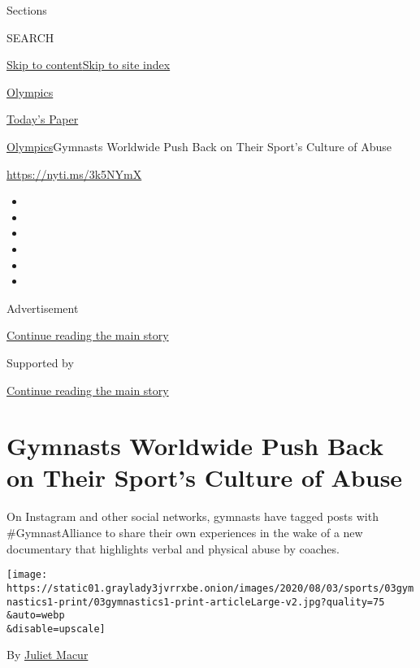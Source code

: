 Sections

SEARCH

\protect\hyperlink{site-content}{Skip to
content}\protect\hyperlink{site-index}{Skip to site index}

\href{https://www.nytimes3xbfgragh.onion/section/sports/olympics}{Olympics}

\href{https://myaccount.nytimes3xbfgragh.onion/auth/login?response_type=cookie\&client_id=vi}{}

\href{https://www.nytimes3xbfgragh.onion/section/todayspaper}{Today's
Paper}

\href{/section/sports/olympics}{Olympics}\textbar{}Gymnasts Worldwide
Push Back on Their Sport's Culture of Abuse

\href{https://nyti.ms/3k5NYmX}{https://nyti.ms/3k5NYmX}

\begin{itemize}
\item
\item
\item
\item
\item
\item
\end{itemize}

Advertisement

\protect\hyperlink{after-top}{Continue reading the main story}

Supported by

\protect\hyperlink{after-sponsor}{Continue reading the main story}

\hypertarget{gymnasts-worldwide-push-back-on-their-sports-culture-of-abuse}{%
\section{Gymnasts Worldwide Push Back on Their Sport's Culture of
Abuse}\label{gymnasts-worldwide-push-back-on-their-sports-culture-of-abuse}}

On Instagram and other social networks, gymnasts have tagged posts with
\#GymnastAlliance to share their own experiences in the wake of a new
documentary that highlights verbal and physical abuse by coaches.

\texttt{[image: https://static01.graylady3jvrrxbe.onion/images/2020/08/03/sports/03gymnastics1-print/03gymnastics1-print-articleLarge-v2.jpg?quality=75\\\&auto=webp\\\&disable=upscale]}

By \href{https://www.nytimes3xbfgragh.onion/by/juliet-macur}{Juliet
Macur}

